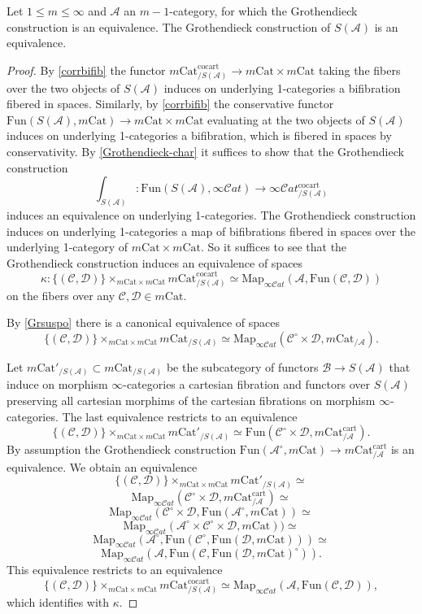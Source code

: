 \documentclass[10pt,oneside]{article}
\numberwithin{equation}{section} %
\numberwithin{figure}{section} %
\theoremstyle{plain}
\theoremstyle{definition}
\newcommand{\mA}{{\mathcal A}}
\newcommand{\mB}{{\mathcal B}}
\newcommand{\mC}{{\mathcal C}}
\newcommand{\mD}{{\mathcal D}}
\newcommand{\m}{{m}}
\newcommand{\Cat}{\mathrm{Cat}}
\newcommand{\Fun}{\mathrm{Fun}}
\newcommand{\cocart}{{\mathrm{cocart}}}
\newcommand{\cart}{{\mathrm{cart}}}
\newcommand{\Map}{{\mathrm{Map}}}
\newcommand{\scat}{\mathcal{C}\mathit{at}}
\begin{document}
\begin{proposition}\label{suspe}
Let $1 \leq \m \leq \infty$ and $\mA$ an $m-1$-category, for which the
Grothendieck construction is an equivalence.
The Grothendieck construction of $ S(\mA) $ is an equivalence.

\end{proposition}

\begin{proof}

By \cref{corrbifib} the functor $m\Cat^\cocart_{/S(\mA)} \to m\Cat \times m\Cat$ taking the fibers over the two objects of $S(\mA)$
induces on underlying 1-categories a bifibration fibered in spaces.
Similarly, by \cref{corrbifib} the conservative functor $\Fun(S(\mA), m\Cat) \to m\Cat \times m\Cat$ evaluating at the two objects of $S(\mA)$
induces on underlying 1-categories a bifibration, which is fibered in spaces by conservativity.
By \cref{Grothendieck-char} it suffices to show that the Grothendieck construction
$$\int_{S(\mA)}: \Fun(S(\mA), \infty\scat) \to \infty\scat^\cocart_{/S(\mA)} $$
induces an equivalence on underlying 1-categories. The Grothendieck construction induces on underlying 1-categories a map of bifibrations 
fibered in spaces over the underlying 1-category of $m\Cat \times m\Cat$.
So it suffices to see that the Grothendieck construction induces an equivalence of spaces $$ \kappa: \{(\mC,\mD)\} \times_{m\Cat \times m\Cat} m\Cat^\cocart_{/S(\mA)} \simeq \Map_{\infty\scat}(\mA,\Fun(\mC,\mD)) $$ on the fibers over any $\mC,\mD \in m\Cat.$


By \cref{Grsuspo} there is a canonical equivalence of spaces
$$ \{(\mC,\mD)\} \times_{m\Cat \times m\Cat} m\Cat_{/S(\mA)} \simeq 
\Map_{\infty\scat}(\mC^\circ \times \mD, m\Cat_{/\mA}).$$

Let $ m\Cat'_{/S(\mA)} \subset m\Cat_{/S(\mA)}$ be the subcategory
of functors $\mB \to S(\mA)$ that induce on morphism $\infty$-categories a cartesian fibration and functors over $S(\mA)$ preserving all cartesian morphims of the cartesian fibrations on morphism $\infty$-categories.
The last equivalence restricts to an equivalence
$$ \{(\mC,\mD)\} \times_{m\Cat \times m\Cat} m\Cat'_{/S(\mA)} \simeq \Fun(\mC^\circ \times \mD, m\Cat^\cart_{/\mA}).$$
By assumption the Grothendieck construction $\Fun(\mA^\circ, m\Cat) \to m\Cat^\cart_{/\mA} $ is an equivalence.
We obtain an equivalence $$ \{(\mC,\mD)\} \times_{m\Cat \times m\Cat} m\Cat'_{/S(\mA)} \simeq $$$$ \Map_{\infty\scat}(\mC^\circ \times \mD, m\Cat^\cart_{/\mA}) \simeq $$$$\Map_{\infty\scat}(\mC^\circ \times \mD,\Fun(\mA^\circ, m\Cat)) \simeq $$$$ \Map_{\infty\scat}(\mA^\circ \times \mC^\circ \times \mD, m\Cat)) \simeq $$$$
\Map_{\infty\scat}(\mA^\circ, \Fun(\mC^\circ, \Fun(\mD, m\Cat))) \simeq $$$$\Map_{\infty\scat}(\mA, \Fun(\mC, \Fun(\mD, m\Cat)^\circ)).$$
This equivalence restricts to an equivalence $$ \{(\mC,\mD)\} \times_{m\Cat \times m\Cat} m\Cat^\cocart_{/S(\mA)} \simeq
\Map_{\infty\scat}(\mA, \Fun(\mC, \mD)),$$ 
which identifies with $\kappa.$
\end{proof}
\end{document}
